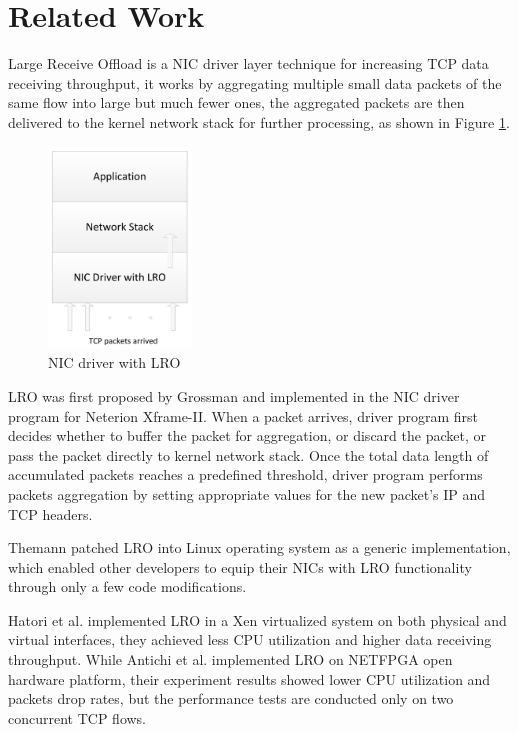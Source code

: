 \documentclass[conference]{IEEEtran}
\begin{document}
\section{Related Work}
Large Receive Offload is a NIC driver layer technique for increasing TCP data receiving throughput, it works by aggregating multiple small data packets of the same flow into large but much fewer ones, the aggregated packets are then delivered to the kernel network stack for further processing, as shown in Figure \ref{driver_with_lro}.
\begin{figure}[!t]
\centering
\includegraphics[width=1.5in]{nic_driver_with_lro}
\caption{NIC driver with LRO}
\label{driver_with_lro}
\end{figure}

LRO was first proposed by Grossman\cite{grossman2005large} and implemented in the NIC driver program for Neterion Xframe-II. When a packet arrives, driver program first decides whether to buffer the packet for aggregation, or discard the packet, or pass the packet directly to kernel network stack. Once the total data length of accumulated packets reaches a predefined threshold, driver program performs packets aggregation by setting appropriate values for the new packet's IP and TCP headers.

Themann\cite{theman2007lro} patched LRO into Linux operating system as a generic implementation, which enabled other developers to equip their NICs with LRO functionality through only a few code modifications.

Hatori\cite{hatori2008implementation} et al. implemented LRO in a Xen virtualized system on both physical and virtual interfaces, they achieved less CPU utilization and higher data receiving throughput. While Antichi\cite{antichi2013implementation} et al. implemented LRO on NETFPGA open hardware platform, their experiment results showed lower CPU utilization and packets drop rates, but the performance tests are conducted only on two concurrent TCP flows.
\end{document}
